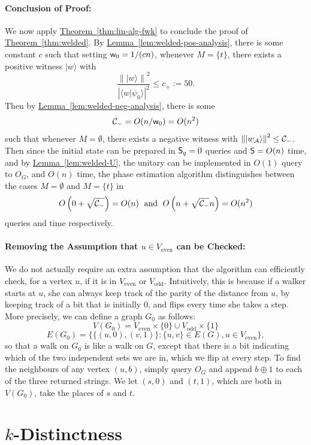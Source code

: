 \documentclass{theoretics}
\newcommand{\thm}[1]{\hyperref[thm:#1]{Theorem~\ref*{thm:#1}}}
\newcommand{\lem}[1]{\hyperref[lem:#1]{Lemma~\ref*{lem:#1}}}
\def\ket#1{{\lvert}#1\rangle}
\renewcommand{\>}{\rangle}
\newcommand{\<}{\langle}
\renewcommand{\(}{\left(}
\renewcommand{\)}{\right)}
\def\braket#1#2{{{\langle}#1\vert}#2\rangle}
\def\norm#1{\left\| #1 \right\|}
\def\w{{\sf w}}
\begin{document}
\paragraph{Conclusion of Proof:} We now apply \thm{lin-alg-fwk} to conclude the proof of \thm{welded}. By \lem{welded-pos-analysis}, there is some constant $c$ such that setting $\w_0={1}/(cn)$, whenever $M=\{t\}$, there exists a positive witness $\ket{w}$ with 
$$\frac{\norm{\ket{w}}^2}{|\braket{w}{\psi_0}|^2}\leq c_+:=50.$$
Then by \lem{welded-neg-analysis}, there is some 
$${\cal C}_-=O(n/\w_0)=O(n^2)$$
such that whenever $M=\emptyset$, there exists a negative witness with
$\norm{\ket{w_{\cal A}}}^2 \leq {\cal C}_-$.
Then since the initial state can be prepared in ${\sf S}_q=0$ queries and ${\sf S}=O(n)$ time, and by \lem{welded-U}, the unitary can be implemented in $O(1)$ query to $O_G$, and $O(n)$ time, the phase estimation algorithm distinguishes between the cases $M=\emptyset$ and $M=\{t\}$ in 
$$O\left(0+\sqrt{{\cal C}_-}\right)=O(n)
\;\mbox{ and }\;O\left(n+\sqrt{{\cal C}_-}n\right)=O(n^2)$$
queries and time respectively.








\paragraph{Removing the Assumption that $u\in V_{\mathrm{even}}$ can be Checked:} We do not actually require an extra assumption that the algorithm can efficiently check, for a vertex $u$, if it is in $V_{\mathrm{even}}$ or $V_{\mathrm{odd}}$. Intuitively, this is because if a walker starts at $u$, she can always keep track of the parity of the distance from $u$, by keeping track of a bit that is initially 0, and flips every time she takes a step. More precisely, we can define a graph $G_0$ as follows:
$$V(G_0) = V_{\mathrm{even}}\times\{0\} \cup V_{\mathrm{odd}}\times \{1\}$$
$$E(G_0) = \{\{(u,0),(v,1)\}: \{u,v\}\in E(G), u\in V_{\mathrm{even}}\},$$
so that a walk on $G_0$ is like a walk on $G$, except that there is a bit indicating which of the two independent sets we are in, which we flip at every step. To find the neighbours of any vertex $(u,b)$, simply query $O_G$ and append $b\oplus 1$ to each of the three returned strings. We let $(s,0)$ and $(t,1)$, which are both in $V(G_0)$, take the places of $s$ and $t$. 




\section{\texorpdfstring{$k$}{k}-Distinctness}\label{sec:k-dist-full}
\end{document}
